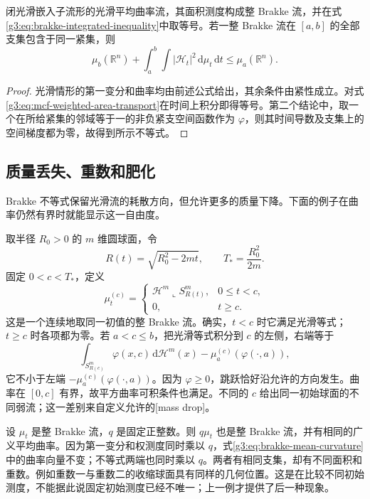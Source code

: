 \begin{corollary}\label{g3:cor:smooth-flow-is-brakke}
	闭光滑嵌入子流形的光滑平均曲率流，其面积测度构成整 Brakke 流，并在式\eqref{g3:eq:brakke-integrated-inequality}中取等号。若一整 Brakke 流在 \([a,b]\) 的全部支集包含于同一紧集，则
	\begin{equation}\label{g3:eq:brakke-total-dissipation}
		\mu_b(\mathbb R^n)+\int_a^b\int|\mathcal H_t|^2\,\mathrm d\mu_t\,\mathrm dt
		\le\mu_a(\mathbb R^n).
	\end{equation}
\end{corollary}
\begin{proof}
	光滑情形的第一变分和曲率均由前述公式给出，其余条件由紧性成立。对式\eqref{g3:eq:mcf-weighted-area-transport}在时间上积分即得等号。第二个结论中，取一个在所给紧集的邻域等于一的非负紧支空间函数作为 \(\varphi\)，则其时间导数及支集上的空间梯度都为零，故得到所示不等式。
\end{proof}

\subsection{质量丢失、重数和肥化}
\label{g3:subsec:2804:03}
Brakke 不等式保留光滑流的耗散方向，但允许更多的质量下降。下面的例子在曲率仍然有界时就能显示这一自由度。

\begin{example}\label{g3:exm:brakke-premature-extinction}
	取半径 \(R_0>0\) 的 \(m\) 维圆球面，令
	\[
	R(t)=\sqrt{R_0^2-2mt},\qquad T_*=\frac{R_0^2}{2m}.
	\]
	固定 \(0<c<T_*\)，定义
	\[
	\mu_t^{(c)}=
	\begin{cases}
		\mathcal H^m\llcorner S^m_{R(t)},&0\le t<c,\\
		0,&t\ge c.
	\end{cases}
	\]
	这是一个连续地取同一初值的整 Brakke 流。确实，\(t<c\) 时它满足光滑等式；\(t\ge c\) 时各项都为零。若 \(a<c\le b\)，把光滑等式积分到 \(c\) 的左侧，右端等于
	\[
	\int_{S^m_{R(c)}}\varphi(x,c)\,\mathrm d\mathcal H^m(x)
	-\mu_a^{(c)}(\varphi(\cdot,a)),
	\]
	它不小于左端 \(-\mu_a^{(c)}(\varphi(\cdot,a))\)。因为 \(\varphi\ge0\)，跳跃恰好沿允许的方向发生。曲率在 \([0,c]\) 有界，故平方曲率可积条件也满足。不同的 \(c\) 给出同一初始球面的不同弱流；这一差别来自定义允许的[mass drop]。
\end{example}

\begin{example}\label{g3:exm:brakke-multiplicity}
	设 \(\mu_t\) 是整 Brakke 流，\(q\) 是固定正整数。则 \(q\mu_t\) 也是整 Brakke 流，并有相同的广义平均曲率。因为第一变分和权测度同时乘以 \(q\)，式\eqref{g3:eq:brakke-mean-curvature}中的曲率向量不变；不等式两端也同时乘以 \(q\)。两者有相同支集，却有不同面积和重数。例如重数一与重数二的收缩球面具有同样的几何位置。这是在比较不同初始测度，不能据此说固定初始测度已经不唯一；上一例才提供了后一种现象。
\end{example}

